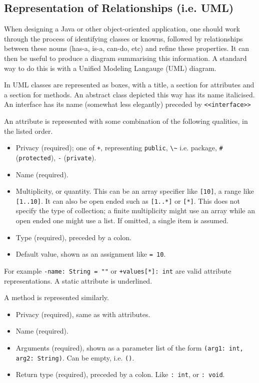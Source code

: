 \documentclass[12pt]{report}
\newcommand{\code}[1]{\lstinline{#1}}
\begin{document}
\begin{flushleft}
\subsection*{Representation of Relationships (i.e. UML)}

When designing a Java or other object-oriented application, one should work
through the process of identifying classes or knowns, followed by relationships
between these nouns (has-a, is-a, can-do, etc) and refine these properties.
It can then be useful to produce a diagram summarising this information. A
standard way to do this is with a Unified Modeling Langauge (UML) diagram. \par
In UML classes are represented as boxes, with a title, a section for attributes
and a section for methods. An abstract class depicted this way has its name
italicised. An interface has its name (somewhat less elegantly) preceded by
\code{<<interface>>} \par
An attribute is represented with some combination of the following qualities,
in the listed order.

\begin{itemize}
    \item Privacy (required); one of \code{+}, representing \code{public},
        \code{\~} i.e. package, \code{#} (\code{protected}), \code{-}
        (\code{private}).
    \item Name (required).
    \item Multiplicity, or quantity. This can be an array specifier like
        \code{[10]}, a range like \code{[1..10]}. It can also be open ended
        such as \code{[1..*]} or \code{[*]}. This does not specify the type
        of collection; a finite multiplicity might use an array while an
        open ended one might use a list. If omitted, a single item is assumed.
    \item Type (required), preceded by a colon.
    \item Default value, shown as an assignment like \code{= 10}.
\end{itemize}

For example \code{-name: String = ""} or \code{+values[*]: int}
are valid attribute representations. A static attribute is underlined. \par
A method is represented similarly.

\begin{itemize}
    \item Privacy (required), same as with attributes.
    \item Name (required).
    \item Arguments (required), shown as a parameter list of the form
        \code{(arg1: int, arg2: String)}. Can be empty, i.e. \code{()}.
    \item Return type (required), preceded by a colon. Like \code{: int}, or
        \code{: void}.
\end{itemize}


\end{flushleft}
\end{document}
